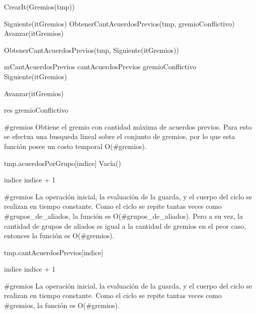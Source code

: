 {
	\state {} \asig CrearIt(Gremios(tmp))							
	\state

	\state {} \asig Siguiente(itGremios)							
	\state {} \asig ObtenerCantAcuerdosPrevios(tmp, gremioConflictivo)				
	\state Avanzar(itGremios)																	
	\state

																	
		\state

		\state {} \asig ObtenerCantAcuerdosPrevios(tmp, Siguiente(itGremios))		

									

			\state mCantAcuerdosPrevios \asig cantAcuerdosPrevios						
			\state gremioConflictivo \asig Siguiente(itGremios)			
		\endif

		\state
		\state Avanzar(itGremios)										
	\endwhile
	\state

	\state res \asig gremioConflictivo									
}
{\#gremios}
{Obtiene el gremio con cantidad m\'axima de acuerdos previos. Para esto se efectua una busqueda lineal sobre el conjunto de gremios, por lo que esta funci\'on posee un costo temporal O(\#gremios).}

{
	\state {} 									
				
		\state

		\state tmp.acuerdosPorGrupo[indice] \asig Vac\'ia()		

		\state
		\state indice \asig indice + 1									
	\endwhile

}
{\#gremios}
{ La operaci\'on inicial, la evaluaci\'on de la guarda, y el cuerpo del ciclo se realizan en tiempo constante. Como el ciclo se repite tantas veces como \#grupos\_de\_aliados, la funci\'on es O(\#grupos\_de\_aliados). Pero a su vez, la cantidad de grupos de aliados es igual a la cantidad de gremios en el peor caso, entonces la funci\'on es O(\#gremios). }

{
	\state {} 					
			
		\state

		\state tmp.cantAcuerdosPrevios[indice] 			

		\state
		\state indice \asig indice + 1					
	\endwhile
}
{\#gremios}
{ La operaci\'on inicial, la evaluaci\'on de la guarda, y el cuerpo del ciclo se realizan en tiempo constante. Como el ciclo se repite tantas veces como \#gremios, la funci\'on es O(\#gremios). }

